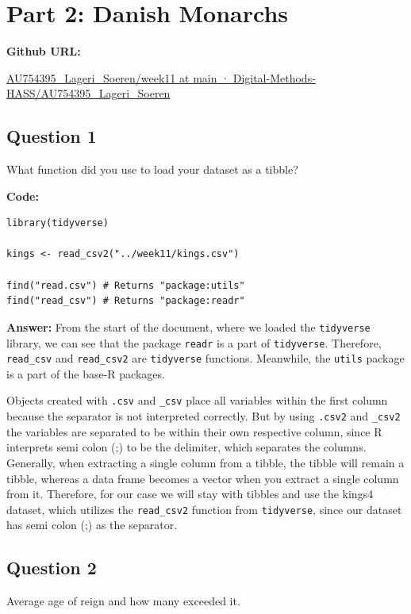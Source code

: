\documentclass[%
  final,  %
  12pt,  %
  british,
  a4paper
]{article}
\begin{document}
\newpage

\section*{Part 2: Danish Monarchs}

\textbf{Github URL:} 

\noindent\href{https://github.com/Digital-Methods-HASS/AU754395_Lageri_Soeren/tree/main/week11}{AU754395\_Lageri\_Soeren/week11 at main · Digital-Methods-HASS/AU754395\_Lageri\_Soeren} 

\subsection*{Question 1}
What function did you use to load your dataset as a tibble?

\textbf{Code:}
\begin{lstlisting}
library(tidyverse)

kings <- read_csv2("../week11/kings.csv")

find("read.csv") # Returns "package:utils"
find("read_csv") # Returns "package:readr"
\end{lstlisting}

\textbf{Answer:}
From the start of the document, where we loaded the \verb|tidyverse| library, we can see that the package \verb|readr| is a part of \verb|tidyverse|. Therefore, \verb|read_csv| and \verb|read_csv2| are \verb|tidyverse| functions. Meanwhile, the \verb|utils| package is a part of the base-R packages.

Objects created with \verb|.csv| and \verb|_csv| place all variables within the first column because the separator is not interpreted correctly.
But by using \verb|.csv2| and \verb|_csv2| the variables are separated to be within their own respective column, since R interprets semi colon (;) to be the delimiter, which separates the columns.
Generally, when extracting a single column from a tibble, the tibble will remain a tibble, whereas a data frame becomes a vector when you extract a single column from it. Therefore, for our case we will stay with tibbles and use the kings4 dataset, which utilizes the \verb|read_csv2| function from \verb|tidyverse|, since our dataset has semi colon (;) as the separator.

\subsection*{Question 2}
Average age of reign and how many exceeded it.
\end{document}
